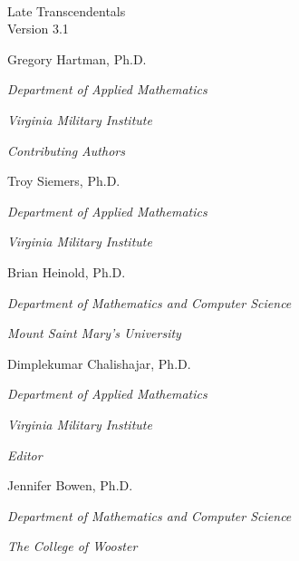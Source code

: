 
\hskip 125pt\begin{minipage}{\textwidth}
\begin{flushright}

\textsc{\large \apex\ {\Huge\thetitle}} \\

Late Transcendentals \\

{\small Version 3.1}\\



\Large

Gregory Hartman, Ph.D.

\emph{\small Department of Applied Mathematics}

\emph{\small Virginia Military Institute}\vskip15pt

\parbox{200pt}{\textit{Contributing Authors}}\hskip 2cm \phantom{.}

Troy Siemers, Ph.D.

\emph{\small Department of Applied Mathematics}

\emph{\small Virginia Military Institute}\vskip 15pt

Brian Heinold, Ph.D.

\emph{\small Department of Mathematics and Computer Science}

\emph{\small Mount Saint Mary's University}\vskip 15pt

Dimplekumar Chalishajar, Ph.D.

\emph{\small Department of Applied Mathematics}

\emph{\small Virginia Military Institute}\vskip 25pt

\parbox{200pt}{\textit{Editor}}\hskip 2cm \phantom{.}

Jennifer Bowen, Ph.D.

\emph{\small Department of Mathematics and Computer Science}

\emph{\small The College of Wooster}

\normalsize
\end{flushright}
\end{minipage}

